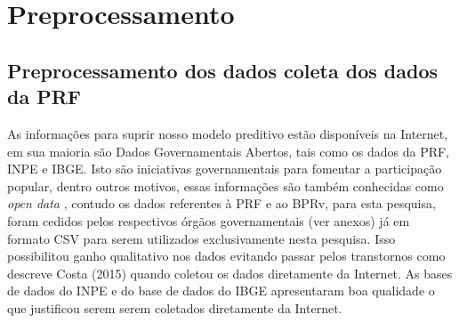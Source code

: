 \chapter{ Preprocessamento}\label{pre}

\section{ Preprocessamento dos dados coleta dos dados da PRF}\label{intro:metodologia}


As informações para suprir nosso modelo preditivo estão disponíveis na Internet, em sua maioria são Dados Governamentais Abertos, tais como os dados
da PRF, INPE e IBGE. Isto são iniciativas governamentais para fomentar a participação popular, dentro outros motivos, essas informações são também 
conhecidas como \textit{open data} \cite{DadosGoverno}, contudo os dados referentes à PRF e ao BPRv, para esta pesquisa, foram cedidos pelos respectivos 
órgãos governamentais (ver anexos) já em formato CSV para serem utilizados exclusivamente nesta pesquisa. Isso possibilitou ganho qualitativo nos dados evitando 
passar pelos transtornos como descreve Costa (2015) quando coletou os dados diretamente da Internet.\cite{Costa2015} 
As bases de dados do INPE e do base de dados do IBGE apresentaram boa qualidade o que justificou serem serem coletados diretamente da Internet.


